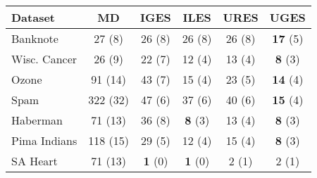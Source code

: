 \begin{tabular}{lccccc}
\toprule
Dataset & MD & IGES & ILES & URES & UGES \\
\midrule
Banknote & 27 (8) & 26 (8) & 26 (8) & 26 (8) & \textbf{17} (5) \\
Wisc. Cancer & 26 (9) & 22 (7) & 12 (4) & 13 (4) & \textbf{8} (3) \\
Ozone & 91 (14) & 43 (7) & 15 (4) & 23 (5) & \textbf{14} (4) \\
Spam & 322 (32) & 47 (6) & 37 (6) & 40 (6) & \textbf{15} (4) \\
Haberman & 71 (13) & 36 (8) & \textbf{8} (3) & 13 (4) & \textbf{8} (3) \\
Pima Indians & 118 (15) & 29 (5) & 12 (4) & 15 (4) & \textbf{8} (3) \\
SA Heart & 71 (13) & \textbf{1} (0) & \textbf{1} (0) & 2 (1) & 2 (1) \\
\bottomrule
\end{tabular}